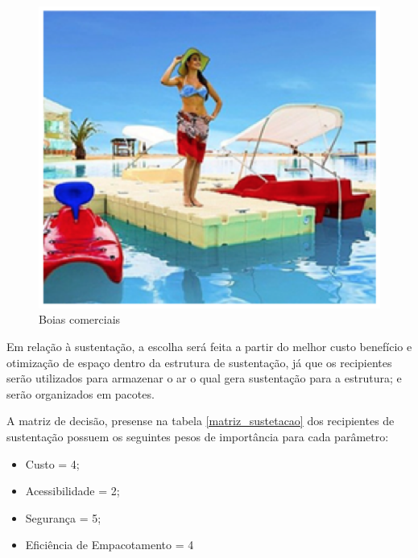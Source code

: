 \begin{figure}[H]
 \centering
   \includegraphics[keepaspectratio=true,scale=0.8]{figuras/boias.eps}
 \caption{Boias comerciais}
 \label{Boias_cormercias}
\end{figure}

Em relação à sustentação, a escolha será feita a partir do melhor custo benefício e otimização de espaço dentro da estrutura de sustentação, já que os recipientes serão utilizados para armazenar o ar o qual gera sustentação para a estrutura; e serão organizados em pacotes.

A matriz de decisão, presense na tabela \ref{matriz_sustetacao} dos recipientes de sustentação possuem os seguintes pesos de importância para cada parâmetro:

\begin{itemize}
  \item Custo = 4;
  \item Acessibilidade = 2;
  \item Segurança = 5;
  \item Eficiência de Empacotamento = 4
\end{itemize}

